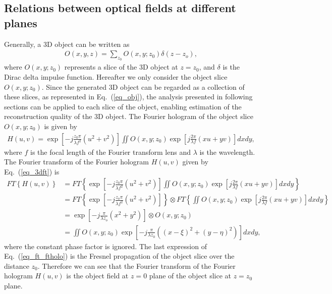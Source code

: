 \documentclass[10pt,letterpaper]{article}
\begin{document}
\subsection{Relations between optical fields at different planes}
Generally, a 3D object can be written as
\begin{equation}
\begin{aligned}
O(x,y,z) = \sum\limits_{z_0} {O(x,y;z_0)\delta(z-z_o),}
\end{aligned}
\label{eq_obj}
\end{equation}
where $O(x, y; z_0)$ represents a slice of the 3D object at $z=z_0$, and $\delta$ is the Dirac delta impulse function. Hereafter we only consider the object slice $O(x, y; z_0)$. Since the generated 3D object can be regarded as a collection of these slices, as represented in Eq.~(\ref{eq_obj}), the analysis presented in following sections can be applied to each slice of the object, enabling estimation of the reconstruction quality of the 3D object. 
The Fourier hologram of the object slice $O(x, y; z_0)$ is given by~\cite{Goodman_2005}
\begin{equation}
\begin{aligned}
H(u,v) = \exp\left[-j\frac{z_0\pi}{\lambda {f^2}}\left(u^2 + v^2\right) \right]\iint{O(x,y;z_0)\exp\left[{j\frac{2\pi }{\lambda f}\left(xu + yv \right)} \right]}dxdy,
\end{aligned}
\label{eq_3dft}
\end{equation}
where $f$ is the focal length of the Fourier transform lens and $\lambda$ is the wavelength. The Fourier transform of the Fourier hologram $H(u, v)$ given by Eq.~(\ref{eq_3dft}) is
\begin{equation}
\begin{aligned}
FT\left\{ H(u,v)\right\} 
& = FT\left\{\exp\left[-j\frac{z_0\pi}{\lambda {f^2}}\left( u^2 + v^2 \right) \right]\iint{O(x,y;z_0)\exp \left[ j\frac{2\pi }{\lambda f}(xu + yv) \right]dxdy} \right\} \\
& = FT\left\{ {\exp \left[ {-j\frac{z_o\pi }{\lambda f^2}\left( {{u^2} + {v^2}} \right)} \right]} \right\} \otimes FT\left\{ \iint{O(x,y;{z_0})\exp \left[ {j\frac{2\pi }{\lambda f}(xu + yv)} \right]dxdy} \right\}  \\
& = \exp \left[ -j\frac{\pi }{\lambda z_o}\left( x^2 + y^2 \right) \right] \otimes O(x,y;z_0)  \\
& = \iint {O(x,y;z_0)\exp \left[-j\frac{\pi}{\lambda z_0}\left((x-\xi )^2 + (y-\eta)^2 \right) \right]dxdy},
\end{aligned}
\label{eq_ft_ftholo}
\end{equation}
where the constant phase factor is ignored. The last expression of Eq.~(\ref{eq_ft_ftholo}) is the Fresnel propagation of the object slice over the distance $z_0$. Therefore we can see that the Fourier transform of the Fourier hologram $H(u, v)$ is the object field at $z=0$ plane of the object slice at $z=z_0$ plane. 
\end{document}
